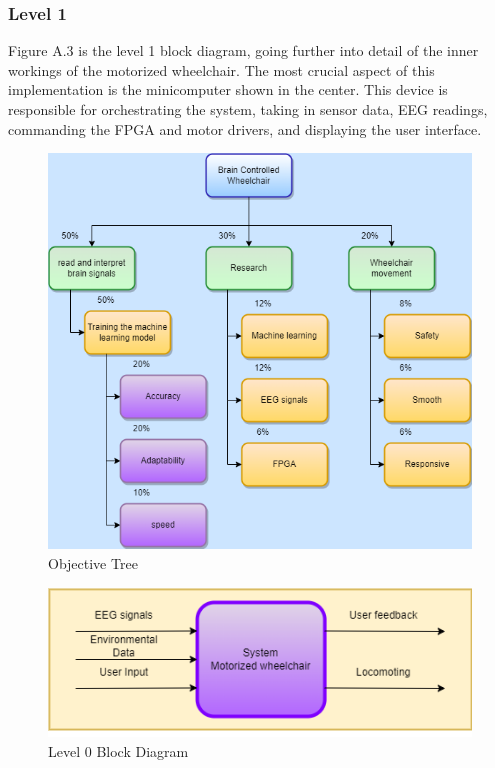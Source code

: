 \documentclass[conference]{IEEEtran}
\begin{document}
        \subsubsection{Level 1}
        Figure A.3 is the level 1 block diagram, going further into detail of  the inner workings of the motorized wheelchair. The most crucial aspect of this implementation is the minicomputer shown in the center. This device is responsible for orchestrating the system, taking in sensor data, EEG readings, commanding the FPGA and motor drivers, and displaying the user interface.  
    \clearpage
    \onecolumn
    \setcounter{figure}{0}
    \renewcommand{\thefigure}{A.\arabic{figure}}
    \begin{figure}
        \centering
        \centerline{\includegraphics{figs/Objective_Tree_Figure_A.1.png}}
            \caption{Objective Tree}
            \label{fig:obj-tree}
    \end{figure}
    \begin{figure}
        \centering
        \centerline{\includegraphics{figs/Level_0_Block_Diagram_Figure_A.2..png}}
        \caption{Level 0 Block Diagram}
        \label{fig:level-0}
    \end{figure}
\end{document}
